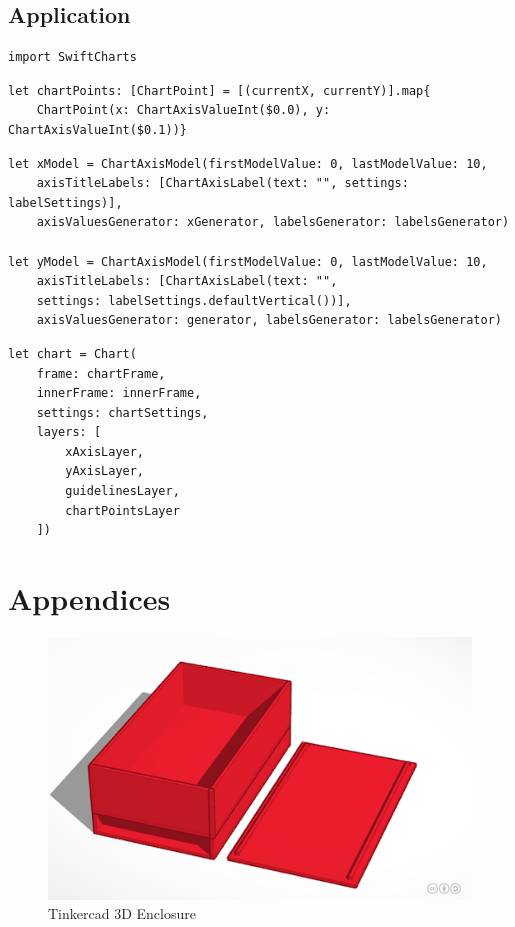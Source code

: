 \documentclass[12pt]{article}
\begin{document}
	\subsection{Application}
		\begin{Verbatim}[fontsize=\small]
import SwiftCharts
		\end{Verbatim}

		\begin{Verbatim}[fontsize=\small]
let chartPoints: [ChartPoint] = [(currentX, currentY)].map{
	ChartPoint(x: ChartAxisValueInt($0.0), y: ChartAxisValueInt($0.1))}
		\end{Verbatim}

		\begin{Verbatim}[fontsize=\small]
let xModel = ChartAxisModel(firstModelValue: 0, lastModelValue: 10,
	axisTitleLabels: [ChartAxisLabel(text: "", settings: labelSettings)],
	axisValuesGenerator: xGenerator, labelsGenerator: labelsGenerator)
    
let yModel = ChartAxisModel(firstModelValue: 0, lastModelValue: 10,
	axisTitleLabels: [ChartAxisLabel(text: "",
	settings: labelSettings.defaultVertical())],
	axisValuesGenerator: generator, labelsGenerator: labelsGenerator)
		\end{Verbatim}

		\begin{Verbatim}[fontsize=\small]
let chart = Chart(
    frame: chartFrame,
    innerFrame: innerFrame,
    settings: chartSettings,
    layers: [
        xAxisLayer,
        yAxisLayer,
        guidelinesLayer,
        chartPointsLayer
    ])
		\end{Verbatim}

\newpage
\section*{Appendices}
	\begin{figure}[!htb]
		\centering
		\includegraphics[scale = .75]{Enclosure.png}
		\caption{Tinkercad 3D Enclosure}
	\end{figure}
\end{document}
